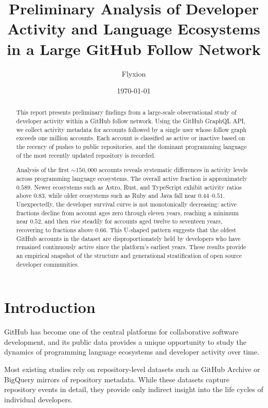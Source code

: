\documentclass[12pt,a4paper]{article}
\title{Preliminary Analysis of Developer Activity and Language Ecosystems\\
in a Large GitHub Follow Network}
\author{Flyxion}
\date{\today}
\begin{document}
\maketitle

\begin{abstract}
This report presents preliminary findings from a large-scale observational study
of developer activity within a GitHub follow network. Using the GitHub GraphQL
API, we collect activity metadata for accounts followed by a single user whose
follow graph exceeds one million accounts. Each account is classified as active
or inactive based on the recency of pushes to public repositories, and the
dominant programming language of the most recently updated repository is
recorded.

Analysis of the first $\sim150{,}000$ accounts reveals systematic differences in
activity levels across programming language ecosystems. The overall active
fraction is approximately $0.589$. Newer ecosystems such as Astro, Rust, and
TypeScript exhibit activity ratios above $0.83$, while older ecosystems such as
Ruby and Java fall near $0.44$--$0.51$. Unexpectedly, the developer survival
curve is not monotonically decreasing: active fractions decline from account ages
zero through eleven years, reaching a minimum near $0.52$, and then \emph{rise}
steadily for accounts aged twelve to seventeen years, recovering to fractions
above $0.66$. This U-shaped pattern suggests that the oldest GitHub accounts in
the dataset are disproportionately held by developers who have remained
continuously active since the platform's earliest years. These results provide an
empirical snapshot of the structure and generational stratification of open
source developer communities.
\end{abstract}

\newpage
\section{Introduction}

GitHub has become one of the central platforms for collaborative software
development, and its public data provides a unique opportunity to study the
dynamics of programming language ecosystems and developer activity over time.

Most existing studies rely on repository-level datasets such as GitHub Archive
or BigQuery mirrors of repository metadata. While these datasets capture
repository events in detail, they provide only indirect insight into the life
cycles of individual developers.
\end{document}
